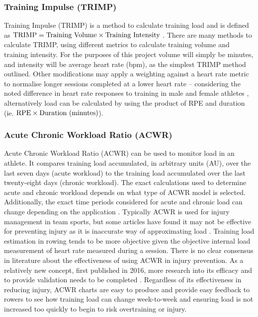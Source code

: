 \subsubsection{Training Impulse (TRIMP)}
Training Impulse (TRIMP) is a method to calculate training load and is defined as  $\textnormal{TRIMP} = \textnormal{Training Volume} \times \textnormal{Training Intensity}$ \autocite{TRIMPmethod}. There are many methods to calculate TRIMP, using different metrics to calculate training volume and training intensity. For the purposes of this project volume will simply be minutes, and intensity will be average heart rate (bpm), as the simplest TRIMP method outlined. Other modifications may apply a weighting against a heart rate metric to normalise longer sessions completed at a lower heart rate -- considering the noted difference in heart rate responses to training in male and female athletes \autocite{Morton1990}, alternatively load can be calculated by using the product of RPE and duration (ie. $\textnormal{RPE} \times \textnormal{Duration (minutes)}$).

\subsubsection{Acute Chronic Workload Ratio (ACWR)}
Acute Chronic Workload Ratio (ACWR) can be used to monitor load in an athlete. It compares training load accumulated, in arbitrary units (AU), over the last seven days (acute workload) to the training load accumulated over the last twenty-eight days (chronic workload). The exact calculations used to determine acute and chronic workload depends on what type of ACWR model is selected. Additionally, the exact time periods considered for acute and chronic load can change depending on the application \cite{White2023}. Typically ACWR is used for injury management in team sports, but some articles have found it may not be effective for preventing injury as it is inaccurate way of approximating load \cite{Impellizzeri2020}. Training load estimation in rowing tends to be more objective given the objective internal load measurement of heart rate measured during a session. There is no clear consensus in literature about the effectiveness of using ACWR in injury prevention. As a relatively new concept, first published in 2016, more research into its efficacy and to provide validation needs to be completed \cite{Zouhal2021}. Regardless of its effectiveness in reducing injury, ACWR charts are easy to produce and provide easy feedback to rowers to see how training load can change week-to-week and ensuring load is not increased too quickly to begin to risk overtraining or injury.


